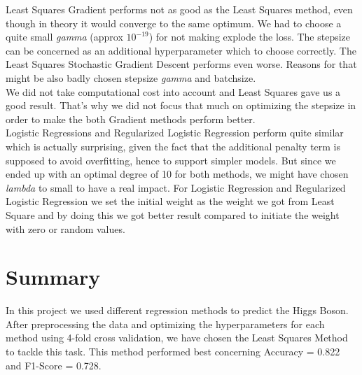 \documentclass[10pt,conference,compsocconf]{IEEEtran}
\begin{document}
 
Least Squares Gradient performs not as good as the Least Squares method, even though in theory it would converge to the same optimum. We had to choose a quite small \textit{gamma} (approx $10^{-19}$) for not making explode the loss. The stepsize can be concerned as an additional hyperparameter which to choose correctly. The Least Squares Stochastic Gradient Descent performs even worse. Reasons for that might be also badly chosen stepsize \textit{gamma} and batchsize.\\
We did not take computational cost into account and Least Squares gave us a good result. That's why we did not focus that much on optimizing the stepsize in order to make the both Gradient methods perform better. \\
Logistic Regressions and Regularized Logistic Regression perform quite similar which is actually surprising, given the fact that the additional penalty term is supposed to avoid overfitting, hence to support simpler models. But since we ended up with an optimal degree of 10 for both methods, we might have chosen \textit{lambda} to small to have a real impact. For Logistic Regression and Regularized Logistic Regression we set the initial weight as the weight we got from Least Square and by doing this we got better result compared to initiate the weight with zero or random values. 


\section{Summary}

In this project we used different regression methods to predict the Higgs Boson. After preprocessing the data and optimizing the hyperparameters for each method using 4-fold cross validation, we have chosen the Least Squares Method to tackle this task. This method performed best concerning Accuracy = 0.822 and F1-Score = 0.728.



%
%
\end{document}
